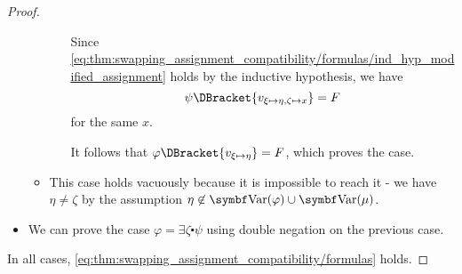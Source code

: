 \begin{proof}
\begin{itemize}
\begin{itemize}
\begin{itemize}
        Since \eqref{eq:thm:swapping_assignment_compatibility/formulas/ind_hyp_modified_assignment} holds by the inductive hypothesis, we have
        \begin{equation*}
          \psi\DBracket{v_{\xi \mapsto \eta, \zeta \mapsto x}} = F
        \end{equation*}
        for the same \( x \).

        It follows that \( \varphi\DBracket{v_{\xi \mapsto \eta}} = F \), which proves the case.
      \end{itemize}

      \item This case holds vacuously because it is impossible to reach it - we have \( \eta \neq \zeta \) by the assumption \( \eta \not\in \Bold{Var}(\varphi) \cup \Bold{Var}(\mu) \).
    \end{itemize}

    \item We can prove the case \( \varphi = \exists \zeta \centerdot \psi \) using double negation on the previous case.
  \end{itemize}

  In all cases, \eqref{eq:thm:swapping_assignment_compatibility/formulas} holds.
\end{proof}

